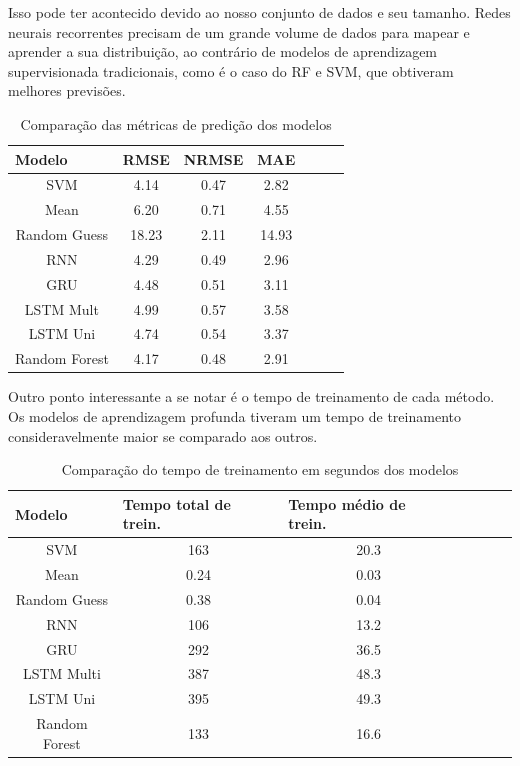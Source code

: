 \documentclass[conference]{IEEEtran}
\begin{document}
Isso pode ter acontecido devido ao nosso conjunto de dados e seu tamanho. Redes neurais recorrentes precisam de um grande volume de dados para mapear e aprender a sua distribuição, ao contrário de modelos de aprendizagem supervisionada tradicionais, como é o caso do RF e SVM, que obtiveram melhores previsões.

\begin{table}[h]
    \caption{Comparação das métricas de predição dos modelos}
    \label{table:RmseComparison}
    \begin{center}
    \begin{tabular}{ccccccc}
    \hline
    \multicolumn{1}{l}{\textbf{Modelo}} & \multicolumn{1}{l}{\textbf{RMSE}} & \multicolumn{1}{l}{\textbf{NRMSE}} & \multicolumn{1}{l}{\textbf{MAE}} \\
    \hline
    SVM & 4.14 & 0.47 & 2.82  \\
    Mean & 6.20 & 0.71 & 4.55 \\
    Random Guess & 18.23 & 2.11 & 14.93\\
    RNN & 4.29 & 0.49 & 2.96 \\ 
    GRU & 4.48 & 0.51 & 3.11  \\ 
    LSTM Mult & 4.99 &  0.57 & 3.58  \\ 
    LSTM Uni & 4.74 &  0.54 & 3.37  \\ 
    Random Forest & 4.17 & 0.48 & 2.91 \\
    \hline
    \end{tabular}
    \end{center}
\end{table}


Outro ponto interessante a se notar é o tempo de treinamento de cada método. Os modelos de aprendizagem profunda tiveram um tempo de treinamento consideravelmente maior se comparado aos outros.

\begin{table}[h]
    \caption{Comparação do tempo de treinamento em segundos dos modelos}
    \label{table:TimeComparison}
    \begin{center}
    \begin{tabular}{ccccccc}
    \hline
    \multicolumn{1}{l}{\textbf{Modelo}} & \multicolumn{1}{l}{\textbf{Tempo total de trein.}} & \multicolumn{1}{l}{\textbf{Tempo médio de trein.}} \\
    \hline
    SVM &  163 & 20.3\\
    Mean & 0.24 & 0.03 \\
    Random Guess & 0.38 & 0.04\\
    RNN & 106 & 13.2   \\ 
    GRU & 292 & 36.5  \\
    LSTM Multi & 387 & 48.3 \\ 
    LSTM Uni & 395 & 49.3 \\ 
    Random Forest & 133 & 16.6 \\
    \hline
    \end{tabular}
    \end{center}
\end{table}
\end{document}
